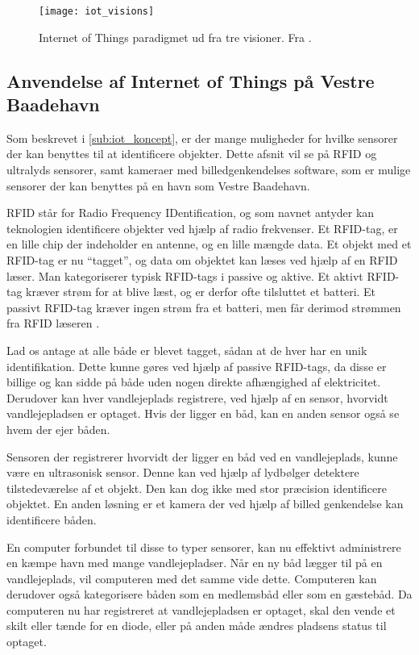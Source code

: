 \begin{figure}
  \centering
  \texttt{[image: iot\_visions]}
  \caption{Internet of Things paradigmet ud fra tre visioner. Fra \cite{iot_survey_2010}.}
  \label{fig:iot_visions}
\end{figure}

\subsection{Anvendelse af Internet of Things på Vestre Baadehavn}
\label{sub:iot_vestre_baadehavn}

Som beskrevet i \cref{sub:iot_koncept}, er der mange muligheder for hvilke sensorer der kan benyttes til at identificere objekter. Dette afsnit vil se på RFID og ultralyds sensorer, samt kameraer med billedgenkendelses software, som er mulige sensorer der kan benyttes på en havn som Vestre Baadehavn.

RFID står for Radio Frequency IDentification, og som navnet antyder kan teknologien identificere objekter ved hjælp af radio frekvenser. Et RFID-tag, er en lille chip der indeholder en antenne, og en lille mængde data. Et objekt med et RFID-tag er nu \enquote{tagget}, og data om objektet kan læses ved hjælp af en RFID læser. Man kategoriserer typisk RFID-tags i passive og aktive. Et aktivt RFID-tag kræver strøm for at blive læst, og er derfor ofte tilsluttet et batteri. Et passivt RFID-tag kræver ingen strøm fra et batteri, men får derimod strømmen fra RFID læseren \cite{want2006rfid}.

Lad os antage at alle både er blevet tagget, sådan at de hver har en unik identifikation. Dette kunne gøres ved hjælp af passive RFID-tags, da disse er billige og kan sidde på både uden nogen direkte afhængighed af elektricitet. Derudover kan hver vandlejeplads registrere, ved hjælp af en sensor, hvorvidt vandlejepladsen er optaget. Hvis der ligger en båd, kan en anden sensor også se hvem der ejer båden.

Sensoren der registrerer hvorvidt der ligger en båd ved en vandlejeplads, kunne være en ultrasonisk sensor. Denne kan ved hjælp af lydbølger detektere tilstedeværelse af et objekt. Den kan dog ikke med stor præcision identificere objektet. En anden løsning er et kamera der ved hjælp af billed genkendelse kan identificere båden.


En computer forbundet til disse to typer sensorer, kan nu effektivt administrere en kæmpe havn med mange vandlejepladser. Når en ny båd lægger til på en vandlejeplads, vil computeren med det samme vide dette. Computeren kan derudover også kategorisere båden som en medlemsbåd eller som en gæstebåd. Da computeren nu har registreret at vandlejepladsen er optaget, skal den vende et skilt eller tænde for en diode, eller på anden måde ændres pladsens status til optaget.


